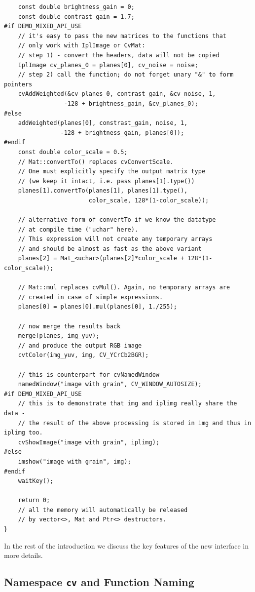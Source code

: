 \begin{lstlisting}
    const double brightness_gain = 0;
    const double contrast_gain = 1.7;
#if DEMO_MIXED_API_USE
    // it's easy to pass the new matrices to the functions that
    // only work with IplImage or CvMat:
    // step 1) - convert the headers, data will not be copied
    IplImage cv_planes_0 = planes[0], cv_noise = noise;
    // step 2) call the function; do not forget unary "&" to form pointers
    cvAddWeighted(&cv_planes_0, contrast_gain, &cv_noise, 1,
                 -128 + brightness_gain, &cv_planes_0);
#else
    addWeighted(planes[0], constrast_gain, noise, 1,
                -128 + brightness_gain, planes[0]);
#endif
    const double color_scale = 0.5;
    // Mat::convertTo() replaces cvConvertScale.
    // One must explicitly specify the output matrix type
    // (we keep it intact, i.e. pass planes[1].type())
    planes[1].convertTo(planes[1], planes[1].type(),
                        color_scale, 128*(1-color_scale));

    // alternative form of convertTo if we know the datatype
    // at compile time ("uchar" here).
    // This expression will not create any temporary arrays
    // and should be almost as fast as the above variant
    planes[2] = Mat_<uchar>(planes[2]*color_scale + 128*(1-color_scale));

    // Mat::mul replaces cvMul(). Again, no temporary arrays are
    // created in case of simple expressions.
    planes[0] = planes[0].mul(planes[0], 1./255);

    // now merge the results back
    merge(planes, img_yuv);
    // and produce the output RGB image
    cvtColor(img_yuv, img, CV_YCrCb2BGR);

    // this is counterpart for cvNamedWindow
    namedWindow("image with grain", CV_WINDOW_AUTOSIZE);
#if DEMO_MIXED_API_USE
    // this is to demonstrate that img and iplimg really share the data -
    // the result of the above processing is stored in img and thus in iplimg too.
    cvShowImage("image with grain", iplimg);
#else
    imshow("image with grain", img);
#endif
    waitKey();

    return 0;
    // all the memory will automatically be released
    // by vector<>, Mat and Ptr<> destructors.
}
\end{lstlisting}

In the rest of the introduction we discuss the key features of the new interface in more details.

\subsection{Namespace \texttt{cv} and Function Naming}

